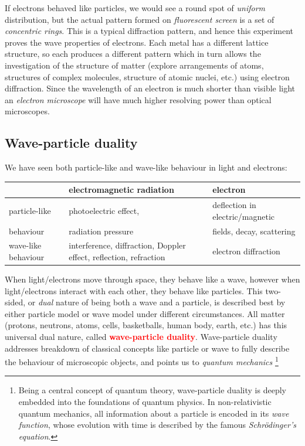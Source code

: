 \documentclass[a4paper,12pt]{book}
\newcommand{\keypoint}[1]{\textbf{\textcolor{red}{#1}}}
\newenvironment{fullwidth}{}{}
\newcommand{\keypoint}[1]{\textbf{\textcolor{red}{#1}}}
\begin{document}
If electrons behaved like particles, we would see a round spot of \emph{uniform} distribution, but the actual pattern formed on \emph{fluorescent screen} is a set of \emph{concentric rings}. This is a typical diffraction pattern, and hence this experiment proves the wave properties of electrons. Each metal has a different lattice structure, so each produces a different pattern which in turn allows the investigation of the structure of matter (explore arrangements of atoms, structures of complex molecules, structure of atomic nuclei, etc.) using electron diffraction. Since the wavelength of an electron is much shorter than visible light an \emph{electron microscope} will have much higher resolving power than optical microscopes.

\subsection{Wave-particle duality}

We have seen both particle-like and wave-like behaviour in light and electrons:

\begin{fullwidth}
\begin{center}
	\begin{tabular}{|D{2.5cm}|D{5.5cm}|D{5cm}|}
		\hline
		& electromagnetic radiation & electron \\ \hline
		particle-like & photoelectric effect, & deflection in electric/magnetic \\
		behaviour & radiation 	pressure &  fields, decay, scattering \\  \hline
		wave-like behaviour & interference, diffraction, Doppler
		effect, reflection, refraction & electron diffraction \\ \hline
	\end{tabular}
\end{center}
\end{fullwidth}

When light/electrons move through space, they behave like a wave, however when light/electrons interact with each other, they behave like particles. This two-sided, or \emph{dual} nature of being both a wave and a particle, is described best by either particle model or wave model under different circumstances. All matter (protons, neutrons, atoms, cells, basketballs, human body, earth, etc.) has this universal dual nature, called \keypoint{wave-particle duality}. Wave-particle duality addresses breakdown of classical concepts like particle or wave to fully describe the behaviour of microscopic objects, and points us to \emph{quantum mechanics}
\footnote{Being a central concept of quantum theory, wave-particle duality is deeply embedded into the foundations of quantum physics. In non-relativistic quantum mechanics, all information about a particle is encoded in its \emph{wave function}, whose evolution with time is described by the famous \emph{Schr\"odinger's equation}.}
\end{document}
